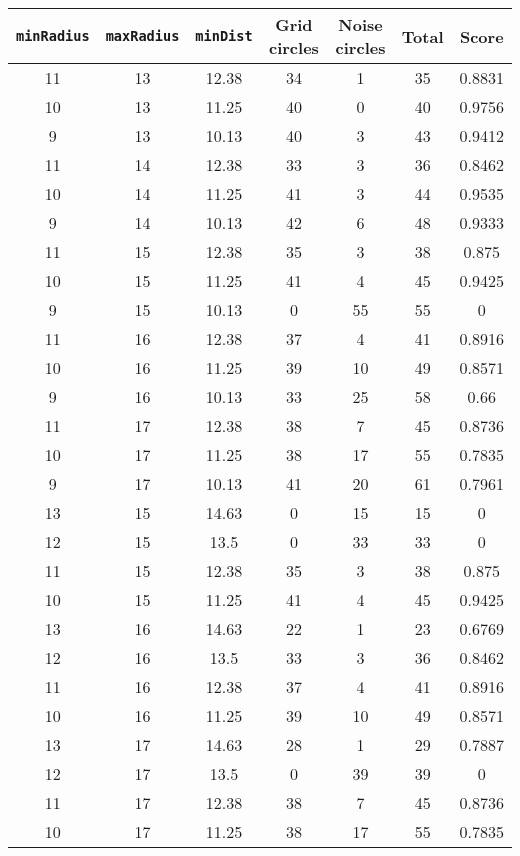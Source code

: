 \documentclass[letterpaper, 12pt]{article}
\begin{document}
\begin{longtable}{|c|c|c|c|c|c|c|}
\hline
\textbf{\texttt{minRadius}} & \textbf{\texttt{maxRadius}} & \textbf{\texttt{minDist}} & \textbf{Grid circles} & \textbf{Noise circles} & \textbf{Total} & \textbf{Score} \\
\hline
11 & 13 & 12.38 & 34 & 1 & 35 & 0.8831 \\
\hline
10 & 13 & 11.25 & 40 & 0 & 40 & 0.9756 \\
\hline
9 & 13 & 10.13 & 40 & 3 & 43 & 0.9412 \\
\hline
11 & 14 & 12.38 & 33 & 3 & 36 & 0.8462 \\
\hline
10 & 14 & 11.25 & 41 & 3 & 44 & 0.9535 \\
\hline
9 & 14 & 10.13 & 42 & 6 & 48 & 0.9333 \\
\hline
11 & 15 & 12.38 & 35 & 3 & 38 & 0.875 \\
\hline
10 & 15 & 11.25 & 41 & 4 & 45 & 0.9425 \\
\hline
9 & 15 & 10.13 & 0 & 55 & 55 & 0 \\
\hline
11 & 16 & 12.38 & 37 & 4 & 41 & 0.8916 \\
\hline
10 & 16 & 11.25 & 39 & 10 & 49 & 0.8571 \\
\hline
9 & 16 & 10.13 & 33 & 25 & 58 & 0.66 \\
\hline
11 & 17 & 12.38 & 38 & 7 & 45 & 0.8736 \\
\hline
10 & 17 & 11.25 & 38 & 17 & 55 & 0.7835 \\
\hline
9 & 17 & 10.13 & 41 & 20 & 61 & 0.7961 \\
\hline
13 & 15 & 14.63 & 0 & 15 & 15 & 0 \\
\hline
12 & 15 & 13.5 & 0 & 33 & 33 & 0 \\
\hline
11 & 15 & 12.38 & 35 & 3 & 38 & 0.875 \\
\hline
10 & 15 & 11.25 & 41 & 4 & 45 & 0.9425 \\
\hline
13 & 16 & 14.63 & 22 & 1 & 23 & 0.6769 \\
\hline
12 & 16 & 13.5 & 33 & 3 & 36 & 0.8462 \\
\hline
11 & 16 & 12.38 & 37 & 4 & 41 & 0.8916 \\
\hline
10 & 16 & 11.25 & 39 & 10 & 49 & 0.8571 \\
\hline
13 & 17 & 14.63 & 28 & 1 & 29 & 0.7887 \\
\hline
12 & 17 & 13.5 & 0 & 39 & 39 & 0 \\
\hline
11 & 17 & 12.38 & 38 & 7 & 45 & 0.8736 \\
\hline
10 & 17 & 11.25 & 38 & 17 & 55 & 0.7835 \\

\end{longtable}
\end{document}
